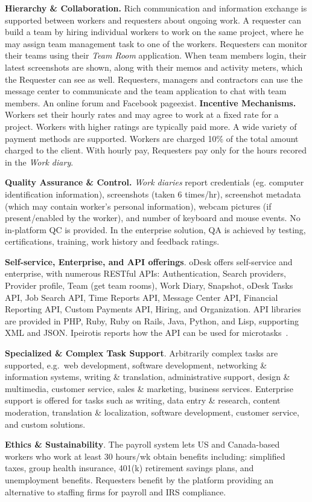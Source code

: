 \documentclass{sigchi}
\begin{document}
{\bf Hierarchy \& Collaboration.} Rich communication and information exchange is supported between workers and requesters about ongoing work. A requester can build a team by hiring individual workers to work on the same project, where he may assign team management task to one of the workers. Requesters can monitor their teams using their {\em Team Room} application. When team members login, their latest screenshots are shown, along with their memos and activity meters, which the Requester can see as well. Requesters, managers and contractors can use the message center to communicate and the team application to chat with team members. An online forum and Facebook pageexist. 
{\bf Incentive Mechanisms.} Workers set their hourly rates and may agree to work at a fixed rate for a project. Workers with higher ratings are typically paid more. A wide variety of payment methods are supported. Workers are charged 10\% of the total amount charged to the client. With hourly pay, Requesters pay only for the hours recored in the {\em Work diary}.

{\bf Quality Assurance \& Control.} {\em Work diaries} report credentials (eg. computer identification information), screenshots (taken 6 times/hr), screenshot metadata (which may contain worker's personal information), webcam pictures (if present/enabled by the worker), and number of keyboard and mouse events. No in-platform QC is provided. In the enterprise solution, QA is achieved by testing, certifications, training, work history and feedback ratings. 

{\bf Self-service, Enterprise, and API offerings}. oDesk offers self-service and enterprise, with numerous RESTful APIs: Authentication, Search providers, Provider profile, Team (get team rooms), Work Diary, Snapshot, oDesk Tasks API, Job Search API, Time Reports API, Message Center API, Financial Reporting API, Custom Payments API, Hiring, and Organization. API libraries are provided in PHP, Ruby, Ruby on Rails, Java, Python, and Lisp, supporting XML and JSON. 
Ipeirotis reports how the API can be used for microtasks~\cite{ipeirotis-odesk-api}. 




{\bf Specialized \& Complex Task Support}. Arbitrarily complex tasks are supported, e.g.\ web development, software development, networking \& information systems, writing \& translation, administrative support, design \& multimedia, customer service, sales \& marketing, business services. Enterprise support is offered for tasks such as writing, data entry \& research, content moderation, translation \& localization, software development, customer service, and custom solutions. 

{\bf Ethics \& Sustainability}. The payroll system lets US and Canada-based workers who work at least 30 hours/wk obtain benefits including: simplified taxes, group health insurance, 401(k) retirement savings plans, and unemployment benefits. Requesters benefit by the platform providing an alternative to staffing firms for payroll and IRS compliance. 
\end{document}
